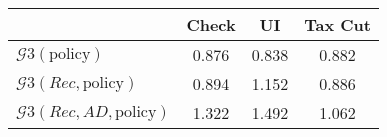 \begin{tabular}{@{}lccc@{}} 
\toprule 
                          & Check      & UI    & Tax Cut    \\  \midrule 
$\mathcal{G}3(\text{policy})$ & 0.876  & 0.838  & 0.882     \\ 
$\mathcal{G}3(Rec,\text{policy})$ & 0.894  & 1.152  & 0.886     \\ 
$\mathcal{G}3(Rec, AD,\text{policy})$ & 1.322  & 1.492  & 1.062     \\ 
\end{tabular}  

